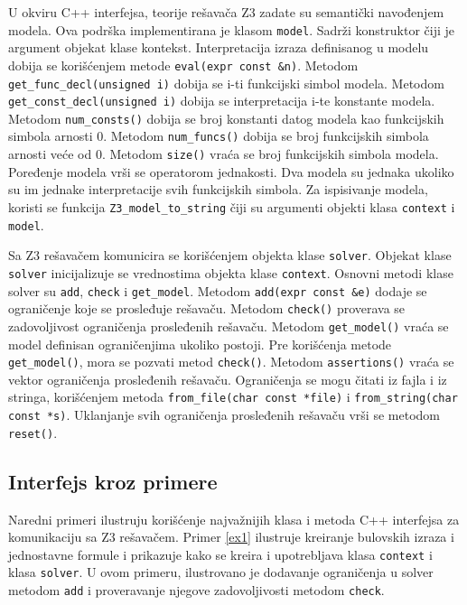\documentclass[12pt,oneside]{memoir}
\begin{document}
U okviru C++ interfejsa, teorije rešavača Z3 zadate su semantički navođenjem modela. Ova podrška implementirana je klasom \texttt{model}. Sadrži konstruktor čiji je argument objekat klase kontekst. Interpretacija izraza definisanog u modelu dobija se korišćenjem metode \texttt{eval(expr const \&n)}. Metodom \texttt{get\_func\_decl(unsigned i)} dobija se i-ti funkcijski simbol modela.  
Metodom \texttt{get\_const\_decl(unsigned i)} dobija se interpretacija i-te konstante modela. Metodom \texttt{num\_consts()} dobija se broj konstanti datog modela kao funkcijskih simbola arnosti 0. Metodom \texttt{num\_funcs()} dobija se broj funkcijskih simbola arnosti veće od 0.  Metodom \texttt{size()} vraća se broj funkcijskih simbola modela. Poređenje modela vrši se operatorom jednakosti. Dva modela su jednaka ukoliko su im jednake interpretacije svih funkcijskih simbola. Za ispisivanje modela, koristi se funkcija \texttt{Z3\_model\_to\_string} čiji su argumenti objekti klasa \texttt{context} i \texttt{model}.\par 


Sa Z3 rešavačem komunicira se korišćenjem objekta klase \texttt{solver}. Objekat klase \texttt{solver} inicijalizuje se vrednostima objekta klase \texttt{context}. Osnovni metodi klase solver su \texttt{add}, \texttt{check} i \texttt{get\_model}. Metodom \texttt{add(expr const \&e)} dodaje se ograničenje koje se prosleđuje rešavaču. Metodom \texttt{check()} proverava se zadovoljivost ograničenja prosleđenih rešavaču. Metodom \texttt{get\_model()} vraća se model definisan ograničenjima ukoliko postoji. Pre korišćenja metode \texttt{get\_model()}, mora se pozvati metod \texttt{check()}. Metodom \texttt{assertions()} vraća se vektor ograničenja prosleđenih rešavaču. Ograničenja se mogu čitati iz fajla i iz stringa, korišćenjem metoda \texttt{from\_file(char const *file)} i \texttt{from\_string(char const *s)}. Uklanjanje svih ograničenja prosleđenih rešavaču vrši se metodom \texttt{reset()}. \par

\subsection{Interfejs kroz primere}
Naredni primeri ilustruju korišćenje najvažnijih klasa i metoda C++ interfejsa za komunikaciju sa Z3 rešavačem. Primer \ref{ex1} ilustruje kreiranje bulovskih izraza i jednostavne formule i prikazuje kako se kreira i upotrebljava klasa \texttt{context} i klasa \texttt{solver}. U ovom primeru, ilustrovano je dodavanje ograničenja u solver metodom \texttt{add} i proveravanje njegove zadovoljivosti metodom \texttt{check}. 
\end{document}

